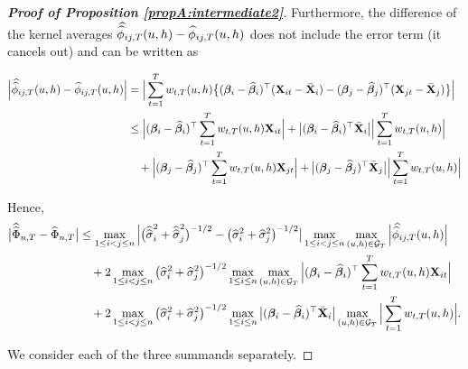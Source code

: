 \documentclass[a4paper,12pt]{article}
\newcommand{\doublehat}[1]{\skew{5.5}\widehat{\widehat{#1}}}
\newcommand{\doublehattwo}[1]{\widehat{\widehat{#1}}}
\begin{document}
\begin{proof}[\textnormal{\textbf{Proof of Proposition \ref{propA:intermediate2}}}]
Furthermore, the difference of the kernel averages $\doublehat{\phi}_{ij, T}(u,h) - \widehat{\phi}_{ij, T}(u,h) $ does not include the error term (it cancels out) and can be written as
\begin{small}\begin{align*}
\Big| \doublehat{\phi}_{ij, T}(u,h) - \widehat{\phi}_{ij, T}(u,h) \Big|  &=\Big| \sum_{t=1}^T w_{t,T}(u,h) \big\{ (\bm{\beta}_i - \widehat{\bm{\beta}}_i)^\top (\mathbf{X}_{it} - \bar{\mathbf{X}}_{i}) - (\bm{\beta}_j - \widehat{\bm{\beta}}_j)^\top (\mathbf{X}_{jt} - \bar{\mathbf{X}}_{j}) \big\} \Big| \\
 &\le \Big|(\bm{\beta}_i - \widehat{\bm{\beta}}_i)^\top \sum_{t=1}^T w_{t,T}(u,h) \mathbf{X}_{it} \Big| +  \big|(\bm{\beta}_i - \widehat{\bm{\beta}}_i)^\top\bar{\mathbf{X}}_{i}\big| \Big| \sum_{t=1}^T w_{t,T}(u,h)  \Big| \\
&\quad +\Big|(\bm{\beta}_j - \widehat{\bm{\beta}}_j)^\top \sum_{t=1}^T w_{t,T}(u,h) \mathbf{X}_{jt}  \Big| + \big|(\bm{\beta}_j - \widehat{\bm{\beta}}_j)^\top\bar{\mathbf{X}}_{j}\big| \Big| \sum_{t=1}^T w_{t,T}(u,h)  \Big| 
\end{align*}
\end{small}

Hence,
\begin{align}\label{ineq-diff-1}
\begin{split}
\big| \doublehattwo{\Phi}_{n, T} - \widehat{\Phi}_{n, T} \big|& \le  \max_{1 \le i < j \le n} \Big|\big(\doublehattwo{\sigma}_i^2 + \doublehattwo{\sigma}_j^2 \big)^{-1/2} - \big(\widehat{\sigma}_i^2 + \widehat{\sigma}_j^2 \big)^{-1/2}\big|\max_{1 \le i< j \le n} \max_{(u,h) \in \mathcal{G}_T} \Big|\doublehat{\phi}_{ij,T}(u,h)\Big| \\
&\quad+ 2\max_{1\le i < j \le n} \big(\widehat{\sigma}_i^2+ \widehat{\sigma}_j^2 \big)^{-1/2} \max_{1 \le i \le n} \max_{(u,h) \in \mathcal{G}_T} \Big| (\bm{\beta}_i - \widehat{\bm{\beta}}_i)^\top\sum_{t=1}^T w_{t,T}(u,h) \mathbf{X}_{it} \Big| \\
&\quad+ 2\max_{1\le i < j \le n} \big(\widehat{\sigma}_i^2+ \widehat{\sigma}_j^2 \big)^{-1/2}\max_{1 \le i \le n}\big|(\bm{\beta}_i - \widehat{\bm{\beta}}_i)^\top\bar{\mathbf{X}}_{i}\big| \max_{(u,h) \in \mathcal{G}_T}  \Big| \sum_{t=1}^T w_{t,T}(u,h)  \Big|.
\end{split}
\end{align}

We consider each of the three summands separately.


\end{proof}
\end{document}
